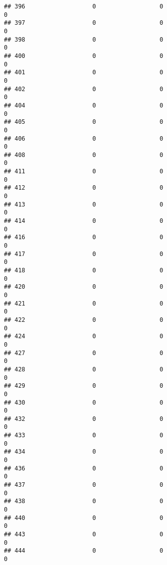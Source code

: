 \documentclass[
]{article}
\begin{document}
\begin{verbatim}
## 396                   0                  0                              0
## 397                   0                  0                              0
## 398                   0                  0                              0
## 400                   0                  0                              0
## 401                   0                  0                              0
## 402                   0                  0                              0
## 404                   0                  0                              0
## 405                   0                  0                              0
## 406                   0                  0                              0
## 408                   0                  0                              0
## 411                   0                  0                              0
## 412                   0                  0                              0
## 413                   0                  0                              0
## 414                   0                  0                              0
## 416                   0                  0                              0
## 417                   0                  0                              0
## 418                   0                  0                              0
## 420                   0                  0                              0
## 421                   0                  0                              0
## 422                   0                  0                              0
## 424                   0                  0                              0
## 427                   0                  0                              0
## 428                   0                  0                              0
## 429                   0                  0                              0
## 430                   0                  0                              0
## 432                   0                  0                              0
## 433                   0                  0                              0
## 434                   0                  0                              0
## 436                   0                  0                              0
## 437                   0                  0                              0
## 438                   0                  0                              0
## 440                   0                  0                              0
## 443                   0                  0                              0
## 444                   0                  0                              0

\end{verbatim}
\end{document}
